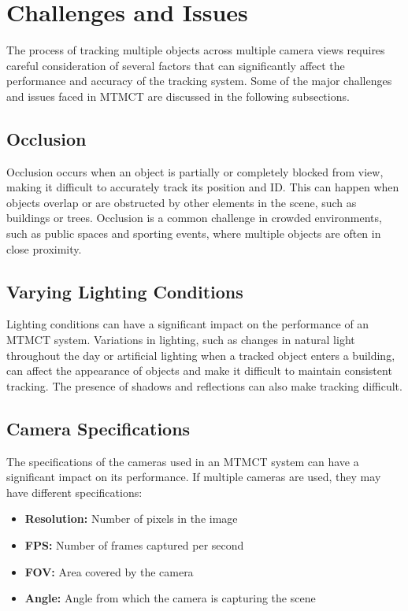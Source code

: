 \section{Challenges and Issues}\label{sec:challenges_and_issues}
The process of tracking multiple objects across multiple camera views requires careful consideration of several factors that can significantly affect the performance and accuracy of the tracking system. Some of the major challenges and issues faced in MTMCT are discussed in the following subsections.

\subsection{Occlusion}\label{subsec:occlusion}
Occlusion occurs when an object is partially or completely blocked from view, making it difficult to accurately track its position and ID. This can happen when objects overlap or are obstructed by other elements in the scene, such as buildings or trees. Occlusion is a common challenge in crowded environments, such as public spaces and sporting events, where multiple objects are often in close proximity.

\subsection{Varying Lighting Conditions}\label{subsec:varying_lighting_conditions}
Lighting conditions can have a significant impact on the performance of an MTMCT system. Variations in lighting, such as changes in natural light throughout the day or artificial lighting when a tracked object enters a building, can affect the appearance of objects and make it difficult to maintain consistent tracking. The presence of shadows and reflections can also make tracking difficult.

\subsection{Camera Specifications}\label{subsec:camera_specification}
The specifications of the cameras used in an MTMCT system can have a significant impact on its performance. If multiple cameras are used, they may have different specifications:

\begin{itemize}
    \item \textbf{Resolution:} Number of pixels in the image
    \item \textbf{FPS:} Number of frames captured per second
    \item \textbf{FOV:} Area covered by the camera
    \item \textbf{Angle:} Angle from which the camera is capturing the scene
\end{itemize}

